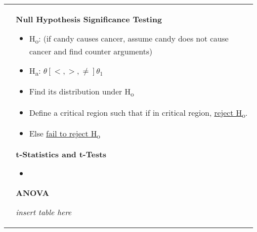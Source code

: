 \documentclass[6pt]{article}
\begin{document}
\begin{scriptsize}
\begin{tabular}{l | l}
&

\parbox{0.5\textwidth}{
\begin{flushright}

\begin{flushleft}
\textbf{Null Hypothesis Significance Testing}
\end{flushleft}

\begin{itemize}


\item H\textsubscript{o}: (if candy causes cancer, assume candy does not cause cancer and find counter arguments)
\item H\textsubscript{a}: $\theta [<,>,\ne] \theta_{1}$
\item Find its distribution under H\textsubscript{o}
\item Define a critical region such that if in critical region, \underline{reject H\textsubscript{o}}.
\item Else \underline{fail to reject H\textsubscript{o}}

\end{itemize}

\begin{flushleft}
\textbf{t-Statistics and t-Tests}
\end{flushleft}
\begin{itemize}
\item <++>
\end{itemize}

\begin{flushleft}
\textbf{ANOVA}

\emph{insert table here}

\end{flushleft}
\end{flushright}
}

\end{tabular}
\end{scriptsize}
\end{document}

